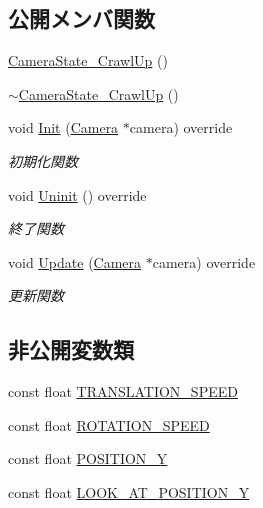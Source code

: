 \subsection*{公開メンバ関数}
\begin{DoxyCompactItemize}
\item 
\mbox{\hyperlink{class_camera_state___crawl_up_a75741967576f6f544007ad8ccc574202}{Camera\+State\+\_\+\+Crawl\+Up}} ()
\item 
\mbox{\hyperlink{class_camera_state___crawl_up_a9b7f2e6cc8be5c356967d8df8c20e93a}{$\sim$\+Camera\+State\+\_\+\+Crawl\+Up}} ()
\item 
void \mbox{\hyperlink{class_camera_state___crawl_up_a43a47eb4e7445c6801e8316c5a635709}{Init}} (\mbox{\hyperlink{class_camera}{Camera}} $\ast$camera) override
\begin{DoxyCompactList}\small\item\em 初期化関数 \end{DoxyCompactList}\item 
void \mbox{\hyperlink{class_camera_state___crawl_up_a046ec18a91e31b210ae000133fa6113a}{Uninit}} () override
\begin{DoxyCompactList}\small\item\em 終了関数 \end{DoxyCompactList}\item 
void \mbox{\hyperlink{class_camera_state___crawl_up_aaebd2634f1677b7c00e6761ed91e1264}{Update}} (\mbox{\hyperlink{class_camera}{Camera}} $\ast$camera) override
\begin{DoxyCompactList}\small\item\em 更新関数 \end{DoxyCompactList}\end{DoxyCompactItemize}
\subsection*{非公開変数類}
\begin{DoxyCompactItemize}
\item 
const float \mbox{\hyperlink{class_camera_state___crawl_up_a7db98276f51f2ff481d491a69840aee9}{T\+R\+A\+N\+S\+L\+A\+T\+I\+O\+N\+\_\+\+S\+P\+E\+ED}}
\item 
const float \mbox{\hyperlink{class_camera_state___crawl_up_af1e1ad90d163cbf9c3abfe9ee21470ed}{R\+O\+T\+A\+T\+I\+O\+N\+\_\+\+S\+P\+E\+ED}}
\item 
const float \mbox{\hyperlink{class_camera_state___crawl_up_ac2e1ac195bd2fcb6b5af30879f989b28}{P\+O\+S\+I\+T\+I\+O\+N\+\_\+Y}}
\item 
const float \mbox{\hyperlink{class_camera_state___crawl_up_ab9d36979fa5a6cfb5033f92632ee5d19}{L\+O\+O\+K\+\_\+\+A\+T\+\_\+\+P\+O\+S\+I\+T\+I\+O\+N\+\_\+Y}}
\end{DoxyCompactItemize}


